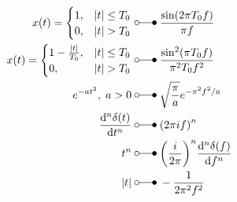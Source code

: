 \begin{align*}
    x(t)=\begin{cases}1,&|t|\le T_0\\0,&|t|>T_0\end{cases} \;                 & \laplace\;  \frac{\sin(2\pi T_0f)}{\pi f}                                              \\
    x(t)=\begin{cases}1-\frac{|t|}{T_0},&|t|\le T_0\\0,&|t|>T_0\end{cases} \; & \laplace\;  \frac{\sin^2(\pi T_0f)}{\pi^2T_0f^2}                                       \\
    e^{-at^{2}},\; a>0 \;                                                     & \laplace\;  \sqrt{\frac{\pi}{a}}e^{-\pi^2f^2/a}                                        \\
    \frac{\mathrm{d}^n\delta(t)}{\mathrm{d}t^n} \;                            & \laplace\;  {(2\pi if)}^n                                                              \\
    t^{n} \;                                                                  & \laplace\;  {\left(\frac{i}{2\pi}\right)}^n\frac{\mathrm{d}^n\delta(f)}{\mathrm{d}f^n} \\
    |t| \;                                                                    & \laplace\;  -\frac1{2\pi^2f^2}
\end{align*}

















